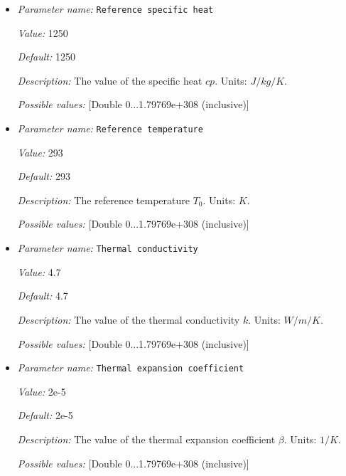 \begin{itemize}
{\it Value:} 3300


{\it Default:} 3300


{\it Description:} Reference density $\rho_0$. Units: $kg/m^3$.


{\it Possible values:} [Double 0...1.79769e+308 (inclusive)]
\item {\it Parameter name:} {\tt Reference specific heat}


{\it Value:} 1250


{\it Default:} 1250


{\it Description:} The value of the specific heat $cp$. Units: $J/kg/K$.


{\it Possible values:} [Double 0...1.79769e+308 (inclusive)]
\item {\it Parameter name:} {\tt Reference temperature}


{\it Value:} 293


{\it Default:} 293


{\it Description:} The reference temperature $T_0$. Units: $K$.


{\it Possible values:} [Double 0...1.79769e+308 (inclusive)]
\item {\it Parameter name:} {\tt Thermal conductivity}


{\it Value:} 4.7


{\it Default:} 4.7


{\it Description:} The value of the thermal conductivity $k$. Units: $W/m/K$.


{\it Possible values:} [Double 0...1.79769e+308 (inclusive)]
\item {\it Parameter name:} {\tt Thermal expansion coefficient}


{\it Value:} 2e-5


{\it Default:} 2e-5


{\it Description:} The value of the thermal expansion coefficient $\beta$. Units: $1/K$.


{\it Possible values:} [Double 0...1.79769e+308 (inclusive)]
\end{itemize}



